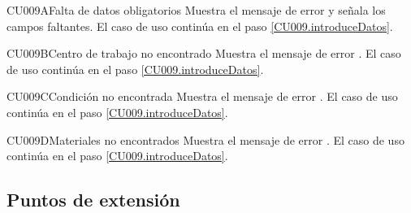 \begin{UCtrayectoriaA}{CU009}{A}{Falta de datos obligatorios}
	\UCpaso Muestra el mensaje de error  y señala los campos faltantes.
	\UCpaso[] El caso de uso continúa en el paso \ref{CU009.introduceDatos}.
\end{UCtrayectoriaA}

\begin{UCtrayectoriaA}{CU009}{B}{Centro de trabajo no encontrado}
	\UCpaso Muestra el mensaje de error .
	\UCpaso[] El caso de uso continúa en el paso \ref{CU009.introduceDatos}.
\end{UCtrayectoriaA}

\begin{UCtrayectoriaA}{CU009}{C}{Condición no encontrada}
	\UCpaso Muestra el mensaje de error .
	\UCpaso[] El caso de uso continúa en el paso \ref{CU009.introduceDatos}.
\end{UCtrayectoriaA}

\begin{UCtrayectoriaA}{CU009}{D}{Materiales no encontrados}
	\UCpaso Muestra el mensaje de error .
	\UCpaso[] El caso de uso continúa en el paso \ref{CU009.introduceDatos}.
\end{UCtrayectoriaA}

\subsection{Puntos de extensión}

